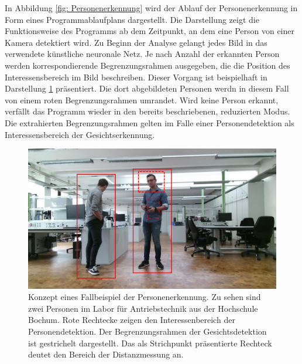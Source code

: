 	In Abbildung \ref{fig: Personenerkennung} wird der Ablauf der Personenerkennung in Form eines Programmablaufplans dargestellt. Die Darstellung zeigt die Funktionsweise des Programms ab dem Zeitpunkt, an dem eine Person von einer Kamera detektiert wird. Zu Beginn der Analyse gelangt jedes Bild in das verwendete künstliche neuronale Netz. Je nach Anzahl der erkannten Person werden korrespondierende Begrenzungsrahmen ausgegeben, die die Position des Interessensbereich im Bild beschreiben. Dieser Vorgang ist beispielhaft in Darstellung \ref{fig: bbox} präsentiert. Die dort abgebildeten Personen werdn in diesem Fall von einem roten Begrenzungsrahmen umrandet. Wird keine Person erkannt, verfällt das Programm wieder in den bereits beschriebenen, reduzierten Modus. Die extrahierten Begrenzungsrahmen gelten im Falle einer Personendetektion als Interessensbereich der Gesichtserkennung.\\
	
	
	\begin{figure}[H]
		\centering
		\includegraphics[width=1\textwidth]{Bilder/person.pdf}
		\caption{Konzept eines Fallbeispiel der Personenerkennung. Zu sehen sind zwei Personen im Labor für Antriebstechnik aus der Hochschule Bochum. Rote Rechtecke zeigen den Interessenbereich der Personendetektion. Der Begrenzungsrahmen der Gesichtsdetektion ist gestrichelt dargestellt. Das als Strichpunkt präsentierte Rechteck deutet den Bereich der Distanzmessung an.}
		\label{fig: bbox}
	\end{figure}
	
